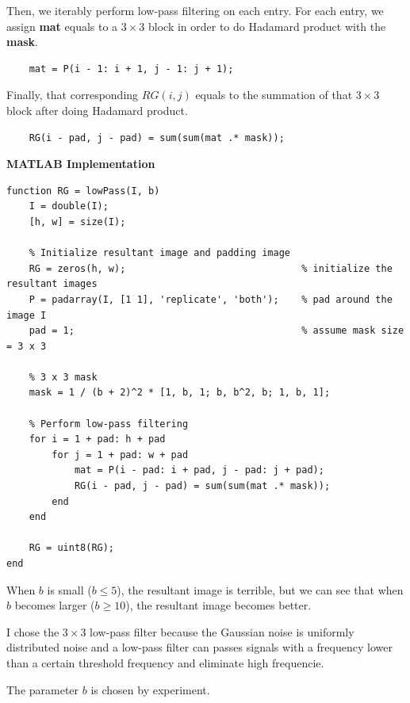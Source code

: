 \documentclass{article}
\newcommand{\tb}{\textbf}
\begin{document}
\begin{enumerate}[label=(\alph*)]
    Then, we iterably perform low-pass filtering on each entry. For each entry, we assign \tb{mat} equals to a $3 \times 3$ block in order to do Hadamard product with the \tb{mask}.

\begin{lstlisting}
    mat = P(i - 1: i + 1, j - 1: j + 1);
\end{lstlisting}

    Finally, that corresponding $RG(i, j)$ equals to the summation of that $3 \times 3$ block after doing Hadamard product.

\begin{lstlisting}
    RG(i - pad, j - pad) = sum(sum(mat .* mask));
\end{lstlisting}   

\tb{MATLAB Implementation}

\begin{lstlisting}
function RG = lowPass(I, b)
    I = double(I);
    [h, w] = size(I);
    
    % Initialize resultant image and padding image
    RG = zeros(h, w);                               % initialize the resultant images
    P = padarray(I, [1 1], 'replicate', 'both');    % pad around the image I
    pad = 1;                                        % assume mask size = 3 x 3
    
    % 3 x 3 mask
    mask = 1 / (b + 2)^2 * [1, b, 1; b, b^2, b; 1, b, 1];
    
    % Perform low-pass filtering
    for i = 1 + pad: h + pad
        for j = 1 + pad: w + pad
            mat = P(i - pad: i + pad, j - pad: j + pad);
            RG(i - pad, j - pad) = sum(sum(mat .* mask));
        end
    end
    
    RG = uint8(RG);
end
\end{lstlisting}
    
    When $b$ is small ($b \le 5$), the resultant image is terrible, but we can see that when $b$ becomes larger ($b \ge 10$), the resultant image becomes better. 

    I chose the $3 \times 3$ low-pass filter because the Gaussian noise is uniformly distributed noise and a low-pass filter can passes signals with a frequency lower than a certain threshold frequency and eliminate high frequencie.
    
    The parameter $b$ is chosen by experiment.

    \begin{figure}[!htb]
        \centering
        

\end{figure}
\end{enumerate}
\end{document}
